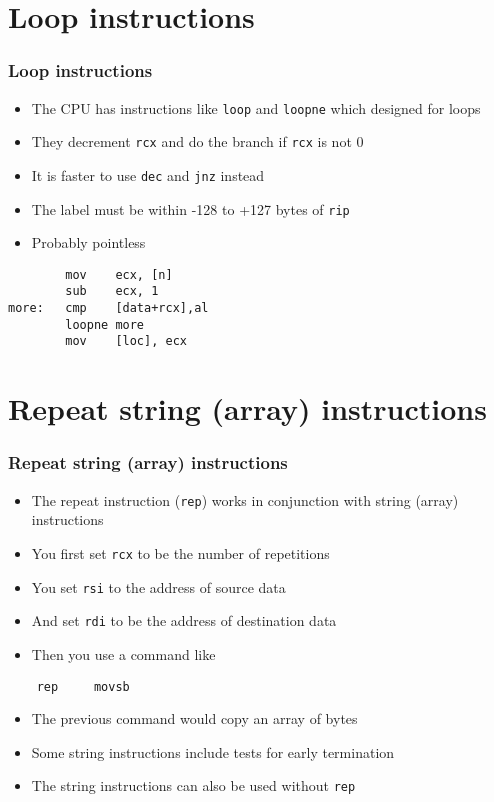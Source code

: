 \documentclass{beamer}
\begin{document}
\section{Loop instructions}

\begin{frame}[fragile]
    \frametitle{Loop instructions}
    \begin{itemize}
        \item The CPU has instructions like {\tt loop} and {\tt loopne} which
              designed for loops
        \item They decrement {\tt rcx} and do the branch if {\tt rcx} is not 0
        \item It is faster to use {\tt dec} and {\tt jnz} instead
        \item The label must be within -128 to +127 bytes of {\tt rip}
        \item Probably pointless
    \end{itemize}
\begin{verbatim}
        mov    ecx, [n]
        sub    ecx, 1
more:   cmp    [data+rcx],al
        loopne more
        mov    [loc], ecx
\end{verbatim}
\end{frame}

\section{Repeat string (array) instructions}

\begin{frame}[fragile]
    \frametitle{Repeat string (array) instructions}
    \begin{itemize}
        \item The repeat instruction ({\tt rep}) works in conjunction
              with string (array) instructions
        \item You first set {\tt rcx} to be the number of repetitions
        \item You set {\tt rsi} to the address of source data
        \item And set {\tt rdi} to be the address of destination data
        \item Then you use a command like
    \end{itemize}
\begin{verbatim}
    rep     movsb
\end{verbatim}
    \begin{itemize}
        \item The previous command would copy an array of bytes
        \item Some string instructions include tests for early termination
        \item The string instructions can also be used without {\tt rep}
    \end{itemize}
\end{frame}
\end{document}
